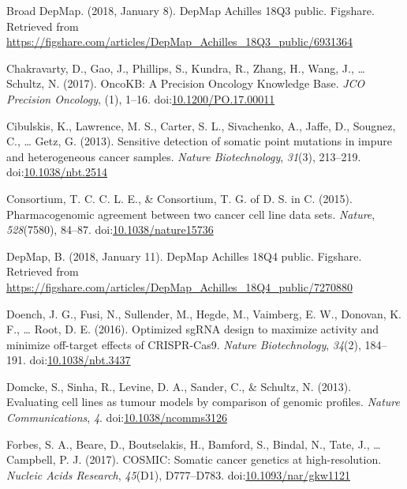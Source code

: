 \documentclass[man]{apa6}
\begin{document}
\hypertarget{ref-broaddepmap2018}{}
Broad DepMap. (2018, January 8). DepMap Achilles 18Q3 public. Figshare.
Retrieved from
\url{https://figshare.com/articles/DepMap_Achilles_18Q3_public/6931364}

\hypertarget{ref-chakravarty2017}{}
Chakravarty, D., Gao, J., Phillips, S., Kundra, R., Zhang, H., Wang, J.,
\ldots{} Schultz, N. (2017). OncoKB: A Precision Oncology Knowledge
Base. \emph{JCO Precision Oncology}, (1), 1--16.
doi:\href{https://doi.org/10.1200/PO.17.00011}{10.1200/PO.17.00011}

\hypertarget{ref-cibulskis2013}{}
Cibulskis, K., Lawrence, M. S., Carter, S. L., Sivachenko, A., Jaffe,
D., Sougnez, C., \ldots{} Getz, G. (2013). Sensitive detection of
somatic point mutations in impure and heterogeneous cancer samples.
\emph{Nature Biotechnology}, \emph{31}(3), 213--219.
doi:\href{https://doi.org/10.1038/nbt.2514}{10.1038/nbt.2514}

\hypertarget{ref-consortium2015}{}
Consortium, T. C. C. L. E., \& Consortium, T. G. of D. S. in C. (2015).
Pharmacogenomic agreement between two cancer cell line data sets.
\emph{Nature}, \emph{528}(7580), 84--87.
doi:\href{https://doi.org/10.1038/nature15736}{10.1038/nature15736}

\hypertarget{ref-broaddepmap2018a}{}
DepMap, B. (2018, January 11). DepMap Achilles 18Q4 public. Figshare.
Retrieved from
\url{https://figshare.com/articles/DepMap_Achilles_18Q4_public/7270880}

\hypertarget{ref-doench2016a}{}
Doench, J. G., Fusi, N., Sullender, M., Hegde, M., Vaimberg, E. W.,
Donovan, K. F., \ldots{} Root, D. E. (2016). Optimized sgRNA design to
maximize activity and minimize off-target effects of CRISPR-Cas9.
\emph{Nature Biotechnology}, \emph{34}(2), 184--191.
doi:\href{https://doi.org/10.1038/nbt.3437}{10.1038/nbt.3437}

\hypertarget{ref-domcke2013}{}
Domcke, S., Sinha, R., Levine, D. A., Sander, C., \& Schultz, N. (2013).
Evaluating cell lines as tumour models by comparison of genomic
profiles. \emph{Nature Communications}, \emph{4}.
doi:\href{https://doi.org/10.1038/ncomms3126}{10.1038/ncomms3126}

\hypertarget{ref-forbes2017}{}
Forbes, S. A., Beare, D., Boutselakis, H., Bamford, S., Bindal, N.,
Tate, J., \ldots{} Campbell, P. J. (2017). COSMIC: Somatic cancer
genetics at high-resolution. \emph{Nucleic Acids Research},
\emph{45}(D1), D777--D783.
doi:\href{https://doi.org/10.1093/nar/gkw1121}{10.1093/nar/gkw1121}
\end{document}
